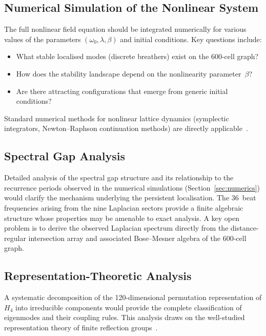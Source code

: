 \documentclass[12pt,a4paper]{article}
\newcommand{\Hfour}{H_4}
\begin{document}
\subsection{Numerical Simulation of the Nonlinear System}

The full nonlinear field equation should be integrated numerically for various
values of the parameters $(\omega_0, \lambda, \beta)$ and initial conditions.
Key questions include:
\begin{itemize}[nosep]
  \item What stable localised modes (discrete breathers) exist on the 600-cell
    graph?
  \item How does the stability landscape depend on the nonlinearity
    parameter~$\beta$?
  \item Are there attracting configurations that emerge from generic initial
    conditions?
\end{itemize}
Standard numerical methods for nonlinear lattice dynamics (symplectic
integrators, Newton--Raphson continuation methods) are directly
applicable~\cite{flach2008}.

\subsection{Spectral Gap Analysis}

Detailed analysis of the spectral gap structure and its relationship to
the recurrence periods observed in the numerical simulations
(Section~\ref{sec:numerics}) would clarify the mechanism underlying the
persistent localisation.  The $36$~beat frequencies arising from the nine
Laplacian sectors provide a finite algebraic structure whose properties
may be amenable to exact analysis.  A key open problem is to derive the
observed Laplacian spectrum directly from the distance-regular
intersection array and associated Bose--Mesner algebra of the 600-cell
graph.

\subsection{Representation-Theoretic Analysis}

A systematic decomposition of the 120-dimensional permutation representation
of $\Hfour$ into irreducible components would provide the complete
classification of eigenmodes and their coupling rules.  This analysis draws on
the well-studied representation theory of finite reflection
groups~\cite{broue2010}.
\end{document}
